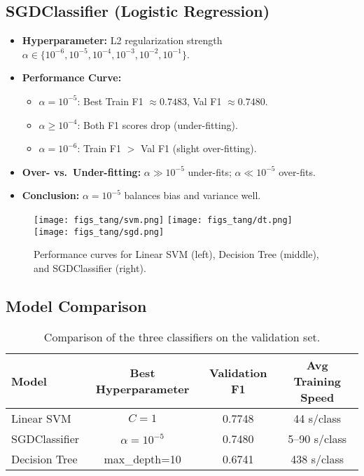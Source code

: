 \documentclass{article}
\begin{document}
\subsection{SGDClassifier (Logistic Regression)}
\begin{itemize}
  \item \textbf{Hyperparameter:} L2 regularization strength $\alpha \in \{10^{-6},10^{-5},10^{-4},10^{-3},10^{-2},10^{-1}\}$.
  \item \textbf{Performance Curve:}
    \begin{itemize}
      \item $\alpha=10^{-5}$: Best Train F1 $\approx0.7483$, Val F1 $\approx0.7480$.
      \item $\alpha\ge10^{-4}$: Both F1 scores drop (under-fitting).
      \item $\alpha=10^{-6}$: Train F1 $>$ Val F1 (slight over-fitting).
    \end{itemize}
  \item \textbf{Over- vs.\ Under-fitting:} \(\alpha\gg10^{-5}\) under-fits; \(\alpha\ll10^{-5}\) over-fits.
  \item \textbf{Conclusion:} $\alpha=10^{-5}$ balances bias and variance well.
\end{itemize}

\begin{figure}[h]
  \centering
  \texttt{[image: figs\_tang/svm.png]}
  \hfill
  \texttt{[image: figs\_tang/dt.png]}
  \hfill
  \texttt{[image: figs\_tang/sgd.png]}
  \caption{Performance curves for Linear SVM (left), Decision Tree (middle), and SGDClassifier (right).}
  \label{fig:hp_curves}
\end{figure}

\subsection{Model Comparison}
\begin{table}[h]
\centering
\begin{tabular}{lccc}
\toprule
\textbf{Model} & \textbf{Best Hyperparameter} & \textbf{Validation F1} & \textbf{Avg Training Speed} \\
\midrule
Linear SVM     & $C=1$                        & 0.7748                & 44 s/class             \\
SGDClassifier  & $\alpha=10^{-5}$             & 0.7480                & 5–90 s/class            \\
Decision Tree  & max\_depth=10                & 0.6741                & 438 s/class             \\
\bottomrule
\end{tabular}
\caption{Comparison of the three classifiers on the validation set.}
\end{table}
\end{document}
